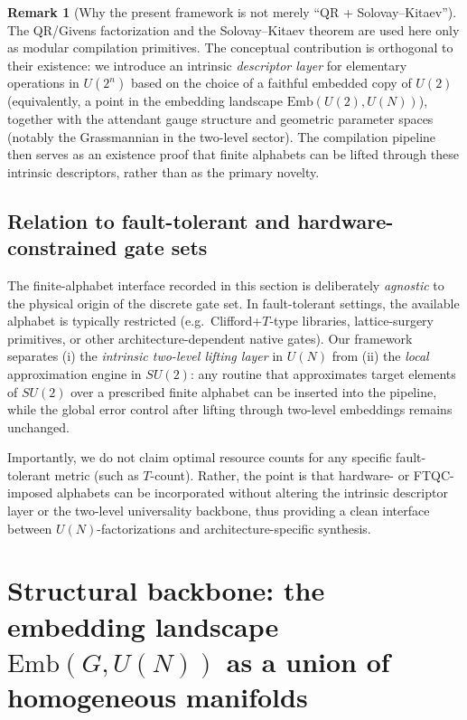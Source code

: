 \documentclass{article}%
\theoremstyle{definition}
\newtheorem{remark}[theorem]{Remark}
\numberwithin{equation}{section}
\newcommand{\Emb}{\mathrm{Emb}}
\begin{document}
\begin{remark}[Why the present framework is not merely ``QR + Solovay--Kitaev'']
\label{rem:not_just_QR_SK}
The QR/Givens factorization and the Solovay--Kitaev theorem are used here only as modular compilation primitives.
The conceptual contribution is orthogonal to their existence: we introduce an intrinsic \emph{descriptor layer} for elementary
operations in $U(2^n)$ based on the choice of a faithful embedded copy of $U(2)$ (equivalently, a point in the embedding landscape
$\Emb(U(2),U(N))$), together with the attendant gauge structure and geometric parameter spaces (notably the Grassmannian in the
two-level sector). The compilation pipeline then serves as an existence proof that finite alphabets can be lifted through these
intrinsic descriptors, rather than as the primary novelty.
\end{remark}

\subsection{Relation to fault-tolerant and hardware-constrained gate sets}
\label{subsec:ftqc_relation}

The finite-alphabet interface recorded in this section is deliberately \emph{agnostic} to the physical origin of the discrete gate set.
In fault-tolerant settings, the available alphabet is typically restricted (e.g.\ Clifford+$T$-type libraries, lattice-surgery primitives,
or other architecture-dependent native gates). Our framework separates (i) the \emph{intrinsic two-level lifting layer} in $U(N)$ from
(ii) the \emph{local} approximation engine in $SU(2)$: any routine that approximates target elements of $SU(2)$ over a prescribed finite
alphabet can be inserted into the pipeline, while the global error control after lifting through two-level embeddings remains unchanged.

Importantly, we do not claim optimal resource counts for any specific fault-tolerant metric (such as $T$-count). Rather, the point is that
hardware- or FTQC-imposed alphabets can be incorporated without altering the intrinsic descriptor layer or the two-level universality backbone,
thus providing a clean interface between $U(N)$-factorizations and architecture-specific synthesis.

\section{Structural backbone: the embedding landscape $\Emb(G,U(N))$ as a union of homogeneous manifolds}
\label{sec:EmbSU2UN}
\end{document}
